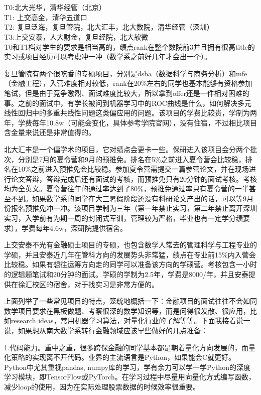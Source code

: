 \documentclass[a4paper,11pt,notitlepage]{article}
\begin{document}
~\\
\\T0:北大光华，清华经管（北京）
\\T1: 上交高金，清华五道口
\\T2: 复旦泛海，复旦管院，北大汇丰，北大数院，清华经管（深圳）
\\T3:上交安泰，人大财金，复旦经院，北大软微~\\

T0和T1档对学生的要求是相当高的，绩点rank在整个数院前3并且拥有很高title的实习或项目经历可以考虑冲一冲（数学系之前好几年才会出一个）。

复旦管院有两个很吃香的专硕项目，分别是dsba（数据科学与商务分析）和mfe（金融工程），入营难度相对较低，rank在20\%左右的同学也基本能够有资格参加笔试，但是由于竞争激烈、面试难度比较大，所以拿到offer还是一件相对困难的事。之前的面试中，有学长被问到机器学习中的ROC曲线是什么，如何解决多元线性回归中的多重共线性问题这类偏应用的问题。该项目的学费比较贵，学制为两年，学费每年10.8w（可能会变化，具体参考学院官网），没有住宿，不过相比项目含金量来说还是非常值得的。

北大汇丰是一个偏学术的项目，它对绩点会更卡一些。保研进入该项目会分两个批次，分别是7月的夏令营和9月的预推免。排名在5\%之前进入夏令营会比较稳，排名在10\%之前进入预推免会比较稳。参加夏令营需提交一篇参营论文，并在现场进行论文答辩，答辩完成后还有面试的考核，而预推免只有20分钟的面试考核。考核均为全英文。夏令营往年的通过率达到了80\%，预推免通过率只有夏令营的一半甚至不到。如果数学系的同学在大三暑假阶段还没有科研论文产出的话，可以等9月份报名预推免冲一冲。该项目学制为三年（第一年禁止实习，第二年禁止离开深圳实习，入学前有为期一周的封闭式军训，管理较为严格，毕业也有一定学分绩要求），学费每年4.6w，深研院提供宿舍。

上交安泰不光有金融硕士项目的专硕，也包含数学人常去的管理科学与工程专业的学硕，并且安泰近几年在管科方向的发展势头非常猛，绩点在专业前15\%内入营会比较稳。如果有想往运筹方向走的同学可以准备该方向的学硕营。考核包含一小时的逻辑题笔试和20分钟的面试。学硕的学制为2.5年，学费是8000/年，并且安泰提供在徐汇校区的宿舍，对于找实习是非常方便的。

上面列举了一些常见项目的特点，笼统地概括一下：金融项目的面试往往不会如同数学项目要求在黑板做题、考察很深的数学知识等，而是问得很发散、很应用，比如research ideas，常用机器学习算法，对量化行业的了解等等。下面我接着说一说，如果想从南大数学系转行金融领域应该早些做好的几点准备：

1.代码能力。重中之重，很多跨保金融的同学基本都是朝着量化方向发展的，而量化策略的实现离不开代码。业界的主流语言是Python，如果能会C就更好。Python中尤其重视pandas, numpy库的学习，学有余力可以学一学Python的深度学习模块，即TensorFlow或PyTorch。在学习过程中尽量用向量化方式编写函数，减少loop的使用，因为在实际处理股票数据的时候效率很重要。
\end{document}
